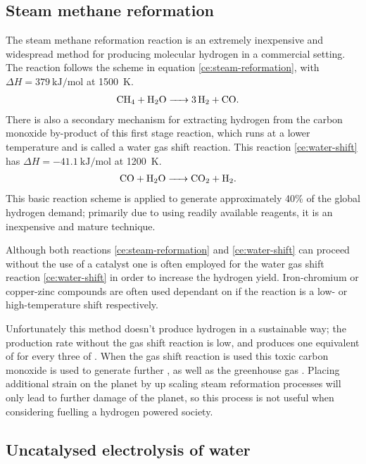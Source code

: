 \subsection{Steam methane reformation}%
\label{sub:steam_methane_reformation}

The steam methane reformation reaction is an extremely inexpensive and widespread method for producing molecular hydrogen in a commercial setting.
The reaction follows the scheme\cite{Saxena2011} in equation \eqref{ce:steam-reformation}, with $\Delta H = \SI{379}{\kilo\joule\per\mole}$ at \SI{1500}{\kelvin}.
\begin{align}
	\ce{CH4 + H2O &-> 3H2 + CO} \label{ce:steam-reformation}
.\end{align}
There is also a secondary mechanism for extracting hydrogen from the carbon monoxide by-product of this first stage reaction, which runs at a lower temperature and is called a water gas shift reaction\cite{Chen2008,Saxena2011}.
This reaction \eqref{ce:water-shift} has $\Delta H = \SI{-41.1}{\kilo\joule\per\mole}$ at \SI{1200}{\kelvin}.
\begin{align}
	\ce{CO + H2O &-> CO2 + H2}\label{ce:water-shift} 
.\end{align}
This basic reaction scheme is applied to generate approximately 40\% of the global hydrogen demand\cite{SBN2020}; primarily due to using readily available reagents, it is an inexpensive and mature technique.

Although both reactions \eqref{ce:steam-reformation} and \eqref{ce:water-shift} can proceed without the use of a catalyst one is often employed for the water gas shift reaction \eqref{ce:water-shift} in order to increase the hydrogen yield.
Iron-chromium or copper-zinc compounds are often used dependant on if the reaction is a low- or high-temperature shift respectively. 

Unfortunately this method doesn't produce hydrogen in a sustainable way; the production rate without the gas shift reaction is low, and produces one equivalent of  for every three of .
When the gas shift reaction is used this toxic carbon monoxide is used to generate further , as well as the greenhouse gas .
Placing additional strain on the planet by up scaling steam reformation processes will only lead to further damage of the planet, so this process is not useful when considering fuelling a hydrogen powered society.


\subsection{Uncatalysed electrolysis of water}%
\label{sub:uncatalysed_electrolysis_of_water}

